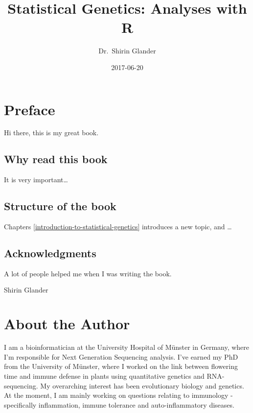 \documentclass[12pt,]{krantz}
\title{Statistical Genetics: Analyses with R}
\author{Dr.~Shirin Glander}
\date{2017-06-20}
\theoremstyle{definition}
\theoremstyle{definition}
\theoremstyle{remark}
\let\BeginKnitrBlock\begin \let\EndKnitrBlock\end
\begin{document}
\maketitle

\pagestyle{empty}\cleardoublepage\newpage

\frontmatter

{
\hypersetup{linkcolor=black}
\setcounter{tocdepth}{1}
\tableofcontents
}
\listoftables
\listoffigures
\chapter*{Preface}\label{preface}


Hi there, this is my great book.

\section*{Why read this book}\label{why-read-this-book}


It is very important\ldots{}

\section*{Structure of the book}\label{structure-of-the-book}


Chapters \ref{introduction-to-statistical-genetics} introduces a new
topic, and \ldots{}

\section*{Acknowledgments}\label{acknowledgments}


A lot of people helped me when I was writing the book.

\BeginKnitrBlock{flushright}
Shirin Glander
\EndKnitrBlock{flushright}

\chapter*{About the Author}\label{about-the-author}


I am a bioinformatician at the University Hospital of Münster in
Germany, where I'm responsible for Next Generation Sequencing analysis.
I've earned my PhD from the University of Münster, where I worked on the
link between flowering time and immune defense in plants using
quantitative genetics and RNA-sequencing. My overarching interest has
been evolutionary biology and genetics. At the moment, I am mainly
working on questions relating to immunology - specifically inflammation,
immune tolerance and auto-inflammatory diseases.
\end{document}
